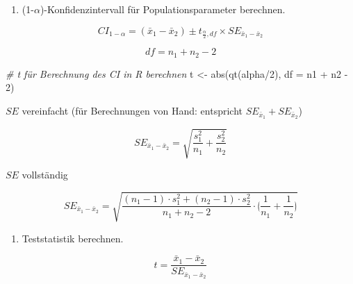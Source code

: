 \documentclass[
]{book}
\newenvironment{Shaded}{\begin{snugshade}}{\end{snugshade}}
\newcommand{\AttributeTok}[1]{\textcolor[rgb]{0.77,0.63,0.00}{#1}}
\newcommand{\CommentTok}[1]{\textcolor[rgb]{0.56,0.35,0.01}{\textit{#1}}}
\newcommand{\DecValTok}[1]{\textcolor[rgb]{0.00,0.00,0.81}{#1}}
\newcommand{\FunctionTok}[1]{\textcolor[rgb]{0.00,0.00,0.00}{#1}}
\newcommand{\NormalTok}[1]{#1}
\newcommand{\OtherTok}[1]{\textcolor[rgb]{0.56,0.35,0.01}{#1}}
\newcommand{\SpecialCharTok}[1]{\textcolor[rgb]{0.00,0.00,0.00}{#1}}
\providecommand{\tightlist}{%
  \setlength{\itemsep}{0pt}\setlength{\parskip}{0pt}}
\begin{document}
\begin{enumerate}
\def\labelenumi{\arabic{enumi}.}
\setcounter{enumi}{3}
\tightlist
\item
  (1-\(\alpha\))-Konfidenzintervall für Populationsparameter berechnen.
\end{enumerate}

\begin{equation}
   CI_{1-\alpha} = (\bar{x}_1 - \bar{x}_2) \pm t_{\frac{\alpha}{2},df} \times SE_{\bar{x}_1 - \bar{x}_2}
   \label{eq:ci-tindep}
\end{equation}

\begin{equation}
  df = n_1 + n_2 - 2
  \label{eq:df-indep}
\end{equation}

\begin{Shaded}
\begin{Highlighting}[]
\CommentTok{\# t für Berechnung des CI in R berechnen}
\NormalTok{t }\OtherTok{\textless{}{-}} \FunctionTok{abs}\NormalTok{(}\FunctionTok{qt}\NormalTok{(alpha}\SpecialCharTok{/}\DecValTok{2}\NormalTok{), }\AttributeTok{df =}\NormalTok{ n1 }\SpecialCharTok{+}\NormalTok{ n2 }\SpecialCharTok{{-}} \DecValTok{2}\NormalTok{)}
\end{Highlighting}
\end{Shaded}

\(SE\) vereinfacht (für Berechnungen von Hand: entspricht \(SE_{\bar{x}_1} + SE_{\bar{x}_2}\))

\begin{equation}
  SE_{\bar{x}_1 - \bar{x}_2} = \sqrt{\frac{s_1^2}{n_1}+\frac{s_2^2}{n_2}}
  \label{eq:se-indep-simple}
\end{equation}

\(SE\) vollständig

\begin{equation}
  SE_{\bar{x}_1 - \bar{x}_2} = \sqrt{\frac{(n_1-1) \cdot s_1^2+(n_2-1) \cdot s_2^2}{n_1+n_2-2}\cdot \lgroup \frac{1}{n_1}+\frac{1}{n_2} \rgroup}
  \label{eq:se-indep-compl}
\end{equation}

\begin{enumerate}
\def\labelenumi{\arabic{enumi}.}
\setcounter{enumi}{4}
\tightlist
\item
  Teststatistik berechnen.
\end{enumerate}

\begin{equation}
  t = \frac{\bar{x}_1 - \bar{x}_2}{SE_{\bar{x}_1 - \bar{x}_2}}
  \label{eq:t-tindep}  
\end{equation}
\end{document}
